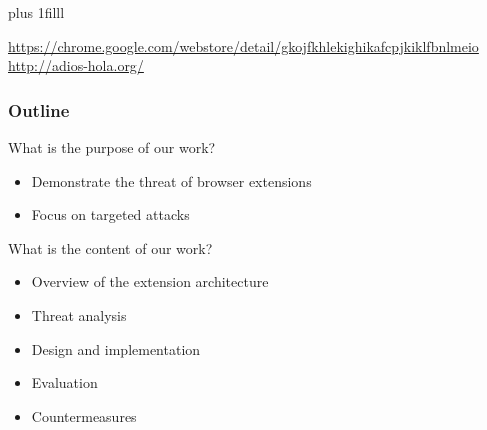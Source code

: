 \documentclass[accentcolor=tud9c,colorbacktitle,xcolor=dvipsnames]{tudbeamer}
\begin{document}
\begin{frame}[plain]
    \vskip0pt plus 1filll
    \begin{footnotesize}
        \url{https://chrome.google.com/webstore/detail/gkojfkhlekighikafcpjkiklfbnlmeio} \\
        \url{http://adios-hola.org/}
    \end{footnotesize}
\end{frame}

\begin{frame}
    \frametitle{Outline}
    \begin{block}{What is the purpose of our work?}
        \begin{itemize}
            \item Demonstrate the threat of browser extensions
            \item Focus on targeted attacks
        \end{itemize}
    \end{block}
    \begin{block}{What is the content of our work?}
        \begin{itemize}
            \item Overview of the extension architecture
            \item Threat analysis
            \item Design and implementation
            \item Evaluation
            \item Countermeasures
        \end{itemize}
    \end{block}
\end{frame}
\end{document}
